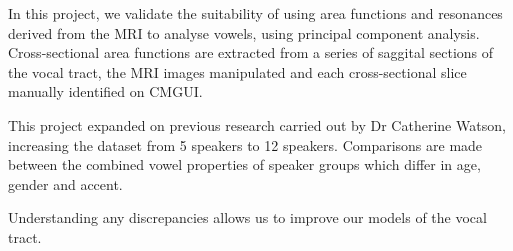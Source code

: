 In this project, we validate the suitability of using area functions and resonances derived from the MRI to analyse vowels, using principal component analysis. Cross-sectional area functions are extracted from a series of saggital sections of the vocal tract, the MRI images manipulated and each cross-sectional slice manually identified on CMGUI. 

This project expanded on previous research carried out by Dr Catherine Watson, increasing the dataset from 5 speakers to 12 speakers. Comparisons are made between the combined vowel properties of speaker groups which differ in age, gender and accent.

Understanding any discrepancies allows us to improve our models of the vocal tract.